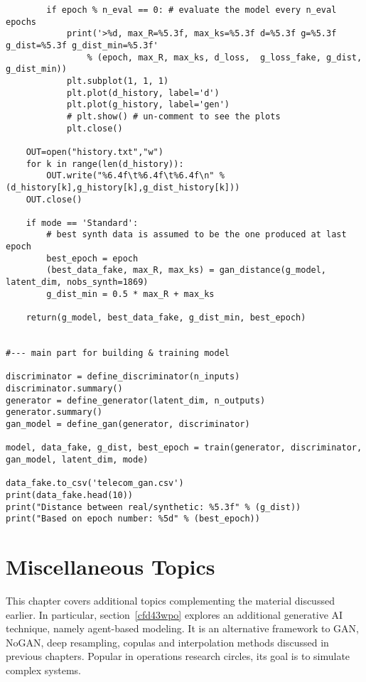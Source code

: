 \documentclass[oneside,10pt]{book}
\begin{document}
\begin{lstlisting}
        if epoch % n_eval == 0: # evaluate the model every n_eval epochs
            print('>%d, max_R=%5.3f, max_ks=%5.3f d=%5.3f g=%5.3f g_dist=%5.3f g_dist_min=%5.3f'  
                % (epoch, max_R, max_ks, d_loss,  g_loss_fake, g_dist, g_dist_min))       
            plt.subplot(1, 1, 1)
            plt.plot(d_history, label='d')
            plt.plot(g_history, label='gen')
            # plt.show() # un-comment to see the plots
            plt.close()
       
    OUT=open("history.txt","w")
    for k in range(len(d_history)):
        OUT.write("%6.4f\t%6.4f\t%6.4f\n" %(d_history[k],g_history[k],g_dist_history[k]))
    OUT.close()
    
    if mode == 'Standard':
        # best synth data is assumed to be the one produced at last epoch
        best_epoch = epoch
        (best_data_fake, max_R, max_ks) = gan_distance(g_model, latent_dim, nobs_synth=1869)  
        g_dist_min = 0.5 * max_R + max_ks 
       
    return(g_model, best_data_fake, g_dist_min, best_epoch) 


#--- main part for building & training model

discriminator = define_discriminator(n_inputs)
discriminator.summary()
generator = define_generator(latent_dim, n_outputs)
generator.summary()
gan_model = define_gan(generator, discriminator)

model, data_fake, g_dist, best_epoch = train(generator, discriminator, gan_model, latent_dim, mode)

data_fake.to_csv('telecom_gan.csv') 
print(data_fake.head(10))
print("Distance between real/synthetic: %5.3f" % (g_dist))
print("Based on epoch number: %5d" % (best_epoch))
\end{lstlisting}




\chapter{Miscellaneous Topics}\label{aasdatk3q}

This chapter covers additional topics complementing the material discussed earlier. In particular, section~\ref{cfd43wpo}
 explores an additional generative AI technique, namely \textcolor{index}{agent-based modeling}.
 It is an alternative framework to GAN, NoGAN, deep resampling, copulas and interpolation methods discussed in previous chapters. Popular
 in operations research circles, its goal is to simulate complex systems.  
\end{document}
